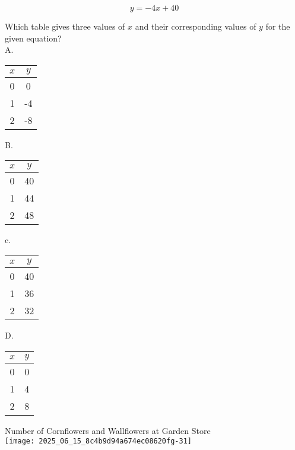 $$
y=-4 x+40
$$

Which table gives three values of $x$ and their corresponding values of $y$ for the given equation?\\
A.

\begin{center}
\begin{tabular}{|c|c|}
\hline
$x$ & $y$ \\
\hline
0 & 0 \\
\hline
1 & -4 \\
\hline
2 & -8 \\
\hline
\end{tabular}
\end{center}

B.

\begin{center}
\begin{tabular}{|c|c|}
\hline
$x$ & $y$ \\
\hline
0 & 40 \\
\hline
1 & 44 \\
\hline
2 & 48 \\
\hline
\end{tabular}
\end{center}

c.

\begin{center}
\begin{tabular}{|c|c|}
\hline
$x$ & $y$ \\
\hline
0 & 40 \\
\hline
1 & 36 \\
\hline
2 & 32 \\
\hline
\end{tabular}
\end{center}

D.

\begin{center}
\begin{tabular}{|c|c|}
\hline
$x$ & $y$ \\
\hline
0 & 0 \\
\hline
1 & 4 \\
\hline
2 & 8 \\
\hline
\end{tabular}
\end{center}

Number of Cornflowers and Wallflowers at Garden Store\\
\texttt{[image: 2025\_06\_15\_8c4b9d94a674ec08620fg-31]}

